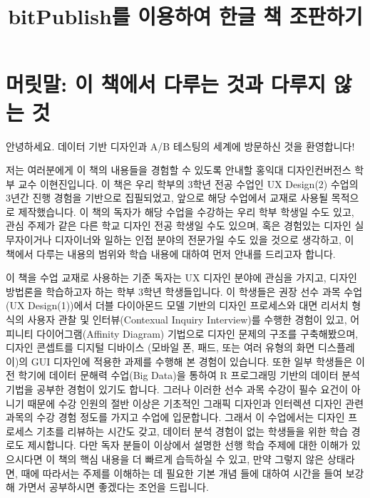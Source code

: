 \documentclass[
  letterpaper,
]{book}
\title{bitPublish를 이용하여 한글 책 조판하기}
\author{}
\date{}
\renewcommand*\contentsname{목차}
\newcommand\contentsname{목차}
\begin{document}
\frontmatter
\maketitle

\renewcommand*\contentsname{목차}
{
\hypersetup{linkcolor=}
\setcounter{tocdepth}{2}
\tableofcontents
}

\mainmatter
{}

\chapter{머릿말: 이 책에서 다루는 것과 다루지 않는
것}\label{uxba38uxb9bfuxb9d0-uxc774-uxcc45uxc5d0uxc11c-uxb2e4uxb8e8uxb294-uxac83uxacfc-uxb2e4uxb8e8uxc9c0-uxc54auxb294-uxac83}

안녕하세요. 데이터 기반 디자인과 A/B 테스팅의 세계에 방문하신 것을
환영합니다!

저는 여러분에게 이 책의 내용들을 경험할 수 있도록 안내할 홍익대
디자인컨버전스 학부 교수 이현진입니다. 이 책은 우리 학부의 3학년 전공
수업인 UX Design(2) 수업의 3년간 진행 경험을 기반으로 집필되었고, 앞으로
해당 수업에서 교재로 사용될 목적으로 제작했습니다. 이 책의 독자가 해당
수업을 수강하는 우리 학부 학생일 수도 있고, 관심 주제가 같은 다른 학교
디자인 전공 학생일 수도 있으며, 혹은 경험있는 디자인 실무자이거나
디자이너와 일하는 인접 분야의 전문가일 수도 있을 것으로 생각하고, 이
책에서 다루는 내용의 범위와 학습 내용에 대하여 먼저 안내를 드리고자
합니다.

이 책을 수업 교재로 사용하는 기준 독자는 UX 디자인 분야에 관심을 가지고,
디자인 방법론을 학습하고자 하는 학부 3학년 학생들입니다. 이 학생들은
권장 선수 과목 수업(UX Design(1))에서 더블 다이아몬드 모델 기반의 디자인
프로세스와 대면 리서치 형식의 사용자 관찰 및 인터뷰(Contexual Inquiry
Interview)를 수행한 경험이 있고, 어피니티 다이어그램(Affinity Diagram)
기법으로 디자인 문제의 구조를 구축해봤으며, 디자인 콘셉트를 디지털
디바이스 (모바일 폰, 패드, 또는 여러 유형의 화면 디스플레이)의 GUI
디자인에 적용한 과제를 수행해 본 경험이 있습니다. 또한 일부 학생들은
이전 학기에 데이터 문해력 수업(Big Data)을 통하여 R 프로그래밍 기반의
데이터 분석 기법을 공부한 경험이 있기도 합니다. 그러나 이러한 선수 과목
수강이 필수 요건이 아니기 때문에 수강 인원의 절반 이상은 기초적인 그래픽
디자인과 인터렉션 디자인 관련 과목의 수강 경험 정도를 가지고 수업에
입문합니다. 그래서 이 수업에서는 디자인 프로세스 기초를 리뷰하는 시간도
갖고, 데이터 분석 경험이 없는 학생들을 위한 학습 경로도 제시합니다. 다만
독자 분들이 이상에서 설명한 선행 학습 주제에 대한 이해가 있으시다면 이
책의 핵심 내용을 더 빠르게 습득하실 수 있고, 만약 그렇지 않은 상태라면,
때에 따라서는 주제를 이해하는 데 필요한 기본 개념 들에 대하여 시간을
들여 보강해 가면서 공부하시면 좋겠다는 조언을 드립니다.
\end{document}
